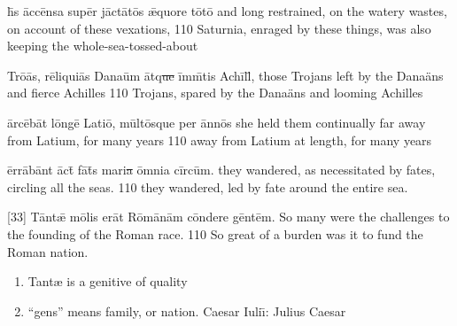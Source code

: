 \latline
{h\={\macron{\i}}s \=acc\={\macron e}ns\-a s\-up\=er j\=act\={\macron a}t\={\macron o}s \={\ae}qu\-or\-e t\={\macron o}t\={\macron o}}
{and long restrained, on the watery wastes, on account of these vexations, }
{110}
{Saturnia, enraged by these things, was also keeping the whole-sea-tossed-about}
{}

\latline
{Tr\={\macron o}\=as, r\=el\-iqu\-i\={\macron a}s D\-an\-a\=um \=atq\sout{ue }\=imm\={\macron{\i}}t\-is \-Ach\=ill\={\macron{\i}},}
{those Trojans left by the Dana\"ans and fierce Achilles }
{110}
{Trojans, spared by the Dana\"ans and looming Achilles}
{}



\latline
{\=arc\={\macron e}b\=at l\=ong\={\macron e} L\-at\-i\={\macron o}, m\=ult\={\macron o}squ\-e p\-er \=ann\={\macron o}s}
{she held them continually far away from Latium, for many years }
{110}
{away from Latium at length, for many years}
{}

\latline
{\=err\={\macron a}b\=ant \={\macron a}ct\={\macron{\i}} f\={\macron a}t\={\macron{\i}}s m\-ar\-i\sout{a }\=omn\-i\-a c\=irc\=um.}
{they wandered, as necessitated by fates, circling all the seas.}
{110}
{they wandered, led by fate around the entire sea.}
{}

\latline
{[33] T\=ant\={\ae} m\={\macron o}l\-is \-er\=at R\={\macron o}m\={\macron a}n\=am c\=ond\-er\-e g\=ent\=em.}
{So many were the challenges to the founding of the Roman race.}
{110}
{So great of a burden was it to fund the Roman nation.}
{
\begin{enumerate}
	\item Tant{\ae} is a genitive of quality
	\item ``gens'' means family, or nation.  Caesar Iuli\={\i}:  Julius Caesar
\end{enumerate}
}
